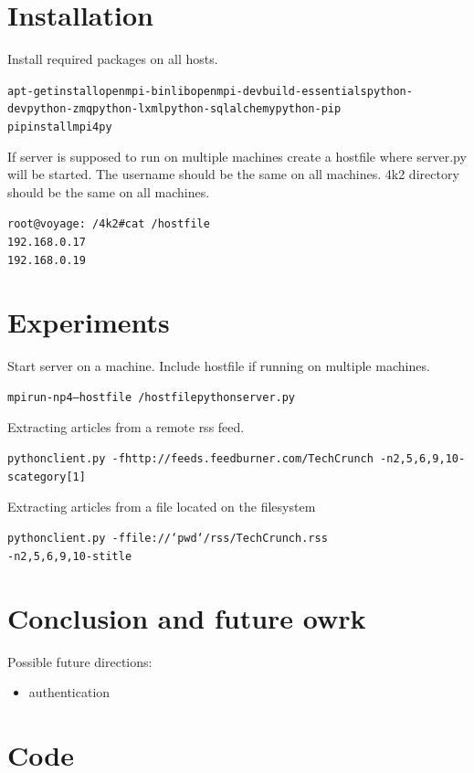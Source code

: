 \documentclass[a4paper,12pt]{article}
\begin{document}
\section{Installation}
Install required packages on all hosts.
\begin{alltt}
apt-get install openmpi-bin libopenmpi-dev build-essentials python-dev python-zmq python-lxml python-sqlalchemy python-pip
pip install mpi4py
\end{alltt}

If server is supposed to run on multiple machines create a hostfile where server.py will be started.
The username should be the same on all machines. 4k2 directory should be the same on all machines.
\begin{alltt}
root@voyage:~/4k2# cat ~/hostfile
192.168.0.17
192.168.0.19
\end{alltt}



\section{Experiments}
Start server on a machine. Include hostfile if running on multiple machines.
\begin{alltt}
mpirun -np 4 --hostfile ~/hostfile python server.py
\end{alltt}

Extracting articles from a remote rss feed.
\begin{alltt}
 python client.py \
-f http://feeds.feedburner.com/TechCrunch \
-n 2,5,6,9,10 -s category[1]
\end{alltt}


Extracting articles from a file located on the filesystem
\begin{alltt}
 python client.py \
-f file://`pwd`/rss/TechCrunch.rss
-n 2,5,6,9,10 -s title
\end{alltt}


\section{Conclusion and future owrk}

Possible future directions:
\begin{itemize}
 \item authentication
\end{itemize}


\section{Code}
\end{document}
